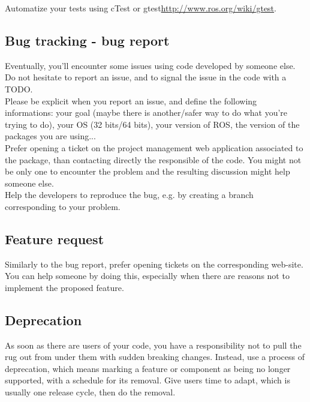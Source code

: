Automatize your tests using cTest or gtest\url{http://www.ros.org/wiki/gtest}.

\subsection{Bug tracking - bug report}
Eventually, you'll encounter some issues using code developed by someone else.\\
Do not hesitate to report an issue, and to signal the issue in the code with a TODO.\\
Please be explicit when you report an issue, and define the following informations:
your goal (maybe there is another/safer way to do what you're trying to do), 
your OS (32 bits/64 bits), your version of ROS, the version of the packages you are using...\\

Prefer opening a ticket on the project management web application associated to the package, than contacting directly the responsible of the code. 
You might not be only one to encounter the problem and the resulting discussion might help someone else.\\

Help the developers to reproduce the bug, e.g. by creating a branch corresponding to your problem.



\subsection{Feature request}
Similarly to the bug report, prefer opening tickets on the corresponding web-site.
You can help someone by doing this, especially when there are reasons not to implement the proposed feature.

\subsection{Deprecation}
As soon as there are users of your code, you have a responsibility not to pull the rug out from under them with sudden breaking changes. 
Instead, use a process of deprecation, which means marking a feature or component as being no longer supported, with a schedule for its removal. Give users time to adapt, which is usually one release cycle, then do the removal.

